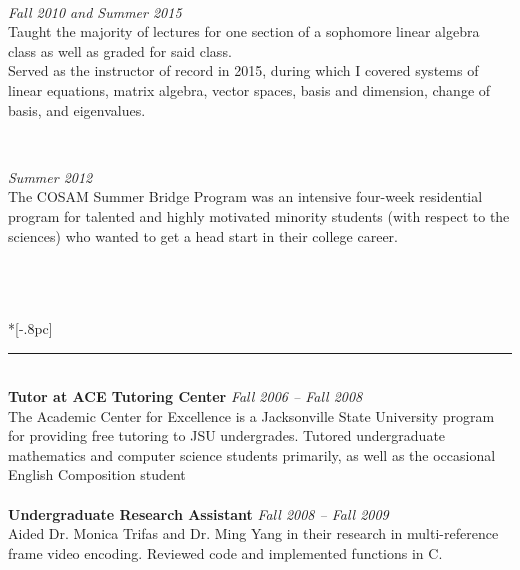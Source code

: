 \documentclass{article}
\begin{document}
\

 \hfill {\it Fall 2010 and Summer 2015}\\
Taught the majority of lectures for one section of a sophomore linear algebra
class as well as graded for said class.\\ Served as the instructor of record in
2015, during which I covered systems of linear equations, matrix algebra, vector
spaces, basis and dimension, change of basis, and eigenvalues.

\

 \hfill {\it Summer 2012}\\
The COSAM Summer Bridge Program was an intensive four-week residential
program for talented and highly motivated minority students (with
respect to the sciences) who wanted to get a head start in their college career.\\
\\

\

 \\*[-.8pc]
\rule{\textwidth}{.1pt} \\
{\bf Tutor at ACE Tutoring Center} \hfill \textit{Fall 2006 -- Fall 2008}\\
The Academic Center for Excellence is a Jacksonville State University program
for providing free tutoring to JSU undergrades. Tutored undergraduate
mathematics and computer science students primarily, as
well as the occasional English Composition student\\
\\
{\bf Undergraduate Research Assistant} \hfill {\it Fall 2008 -- Fall 2009} \\
Aided Dr. Monica Trifas and Dr. Ming Yang in their research in multi-reference
frame video encoding. Reviewed code and implemented functions in C.\\
\end{document}
